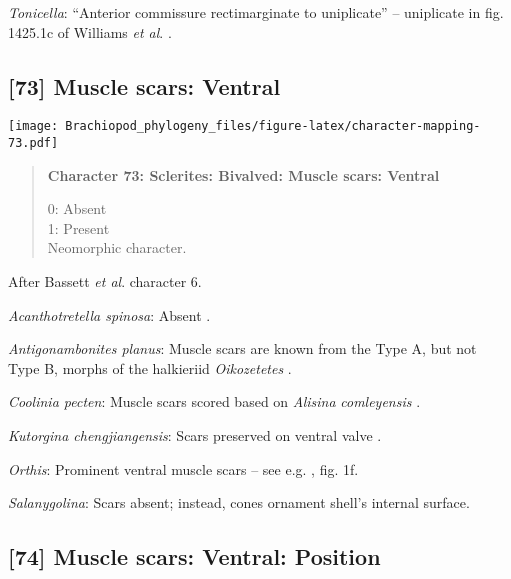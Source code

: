 \documentclass[openany]{book}
\theoremstyle{definition}
\theoremstyle{definition}
\theoremstyle{definition}
\theoremstyle{remark}
\begin{document}
\hypertarget{Tonicella-coding-72}{}
\emph{Tonicella}: ``Anterior commissure rectimarginate to uniplicate''
-- uniplicate in fig. 1425.1c of Williams \emph{et al}.
\citeyearpar{Williams2006Rhynchonelliformeapart}.

\subsection*{{[}73{]} Muscle scars: Ventral}\label{muscle-scars-ventral}

\texttt{[image: Brachiopod\_phylogeny\_files/figure-latex/character-mapping-73.pdf]}

\begin{quote}
\textbf{Character 73: Sclerites: Bivalved: Muscle scars: Ventral }

0: Absent\\
1: Present\\
Neomorphic character.
\end{quote}

After Bassett \emph{et al}.
\citeyearpar{Bassett2001Functionalmorphology} character 6.

\hypertarget{Acanthotretella_spinosa-coding-73}{}
\emph{Acanthotretella spinosa}: Absent \citep{Schwabe2010}.

\hypertarget{Antigonambonites_planus-coding-73}{}
\emph{Antigonambonites planus}: Muscle scars are known from the Type A,
but not Type B, morphs of the halkieriid \emph{Oikozetetes}
\citep{Paterson2009, Jacquet2014}.

\hypertarget{Coolinia_pecten-coding-73}{}
\emph{Coolinia pecten}: Muscle scars scored based on \emph{Alisina}
\emph{comleyensis} \citep{Bassett2001Functionalmorphology}.

\hypertarget{Kutorgina_chengjiangensis-coding-73}{}
\emph{Kutorgina chengjiangensis}: Scars preserved on ventral valve
\citep{Nikitin1984}.

\hypertarget{Orthis-coding-73}{}
\emph{Orthis}: Prominent ventral muscle scars -- see e.g.
\citet{Holmer2008TheEarly}, fig. 1f.

\hypertarget{Salanygolina-coding-73}{}
\emph{Salanygolina}: Scars absent; instead, cones ornament shell's
internal surface.

\subsection*{{[}74{]} Muscle scars: Ventral:
Position}\label{muscle-scars-ventral-position}
\end{document}
